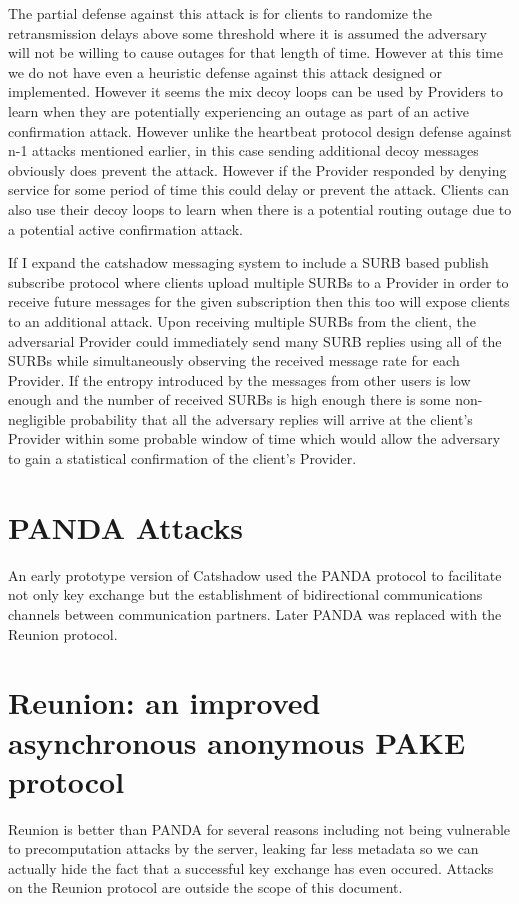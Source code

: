 \documentclass[conference]{IEEEtran}
\begin{document}
The partial defense against this attack is for clients to randomize
the retransmission delays above some threshold where it is assumed the
adversary will not be willing to cause outages for that length of
time. However at this time we do not have even a heuristic defense
against this attack designed or implemented. However it seems the mix
decoy loops can be used by Providers to learn when they are
potentially experiencing an outage as part of an active confirmation
attack. However unlike the heartbeat protocol design defense against
n-1 attacks mentioned earlier, in this case sending additional decoy
messages obviously does prevent the attack. However if the Provider
responded by denying service for some period of time this could delay
or prevent the attack. Clients can also use their decoy loops to learn
when there is a potential routing outage due to a potential active
confirmation attack.

If I expand the catshadow messaging system to include a SURB based
publish subscribe protocol where clients upload multiple SURBs to a
Provider in order to receive future messages for the given
subscription then this too will expose clients to an additional
attack. Upon receiving multiple SURBs from the client, the adversarial
Provider could immediately send many SURB replies using all of the
SURBs while simultaneously observing the received message rate for
each Provider. If the entropy introduced by the messages from other
users is low enough and the number of received SURBs is high enough
there is some non-negligible probability that all the adversary
replies will arrive at the client's Provider within some probable
window of time which would allow the adversary to gain a statistical
confirmation of the client's Provider.

\section{PANDA Attacks}
An early prototype version of Catshadow used the PANDA protocol \cite{PANDA} 
to facilitate not only key exchange but the establishment of bidirectional 
communications channels between communication partners. Later PANDA was 
replaced with the Reunion protocol.

\section{Reunion: an improved asynchronous anonymous PAKE protocol}
Reunion is better than PANDA for several reasons including not being
vulnerable to precomputation attacks by the server, leaking far less
metadata so we can actually hide the fact that a successful key exchange
has even occured. Attacks on the Reunion protocol are outside the scope
of this document.
\end{document}
